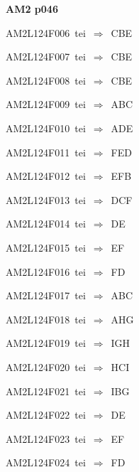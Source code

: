 \par\vfill\eject
{\bf\hfill AM2 p046\hfill\hbox{}}\par\bigskip
{\sixrm AM2L124F006\ {\sixit tei}\ }$\Rightarrow$\ CBE\par\smallskip
{\sixrm AM2L124F007\ {\sixit tei}\ }$\Rightarrow$\ CBE\par\smallskip
{\sixrm AM2L124F008\ {\sixit tei}\ }$\Rightarrow$\ CBE\par\smallskip
{\sixrm AM2L124F009\ {\sixit tei}\ }$\Rightarrow$\ ABC\par\smallskip
{\sixrm AM2L124F010\ {\sixit tei}\ }$\Rightarrow$\ ADE\par\smallskip
{\sixrm AM2L124F011\ {\sixit tei}\ }$\Rightarrow$\ FED\par\smallskip
{\sixrm AM2L124F012\ {\sixit tei}\ }$\Rightarrow$\ EFB\par\smallskip
{\sixrm AM2L124F013\ {\sixit tei}\ }$\Rightarrow$\ DCF\par\smallskip
{\sixrm AM2L124F014\ {\sixit tei}\ }$\Rightarrow$\ DE\par\smallskip
{\sixrm AM2L124F015\ {\sixit tei}\ }$\Rightarrow$\ EF\par\smallskip
{\sixrm AM2L124F016\ {\sixit tei}\ }$\Rightarrow$\ FD\par\smallskip
{\sixrm AM2L124F017\ {\sixit tei}\ }$\Rightarrow$\ ABC\par\smallskip
{\sixrm AM2L124F018\ {\sixit tei}\ }$\Rightarrow$\ AHG\par\smallskip
{\sixrm AM2L124F019\ {\sixit tei}\ }$\Rightarrow$\ IGH\par\smallskip
{\sixrm AM2L124F020\ {\sixit tei}\ }$\Rightarrow$\ HCI\par\smallskip
{\sixrm AM2L124F021\ {\sixit tei}\ }$\Rightarrow$\ IBG\par\smallskip
{\sixrm AM2L124F022\ {\sixit tei}\ }$\Rightarrow$\ DE\par\smallskip
{\sixrm AM2L124F023\ {\sixit tei}\ }$\Rightarrow$\ EF\par\smallskip
{\sixrm AM2L124F024\ {\sixit tei}\ }$\Rightarrow$\ FD\par\smallskip

